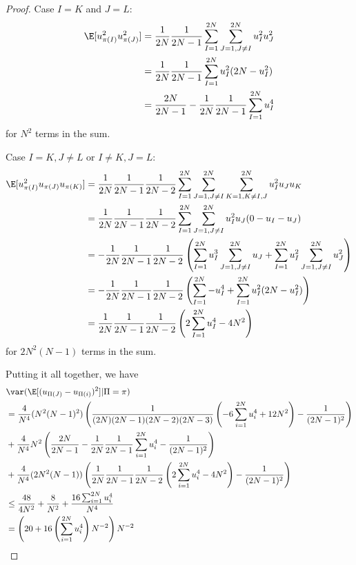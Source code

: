 \begin{proof}
  Case $I=K$ and $J=L$:
  \begin{align*}
    \E[u_{\pi(I)}^2 u_{\pi(J)}^2] &= \frac{1}{2N}\frac{1}{2N-1} \sum_{I=1}^{2N}
    \sum_{J=1, J\neq I}^{2N} u_{I}^2 u_{J}^2 \\
    &= \frac{1}{2N}\frac{1}{2N-1} \sum_{I=1}^{2N} u_{I}^2 (2N - u_{I}^2) \\
    &= \frac{2N}{2N-1}-\frac{1}{2N}\frac{1}{2N-1} \sum_{I=1}^{2N} u_{I}^4
  \end{align*}
  for $N^2$ terms in the sum.

  Case $I=K, J\neq L$ or $I\neq K, J= L$:
  \begin{align*}
    \E[u_{\pi(I)}^2 u_{\pi(J)} u_{\pi(K)}] &= \frac{1}{2N}\frac{1}{2N-1}\frac{1}{2N-2} \sum_{I=1}^{2N}
    \sum_{J=1, J\neq I}^{2N} \sum_{K=1, K \neq I,J}^{2N} u_{I}^2 u_{J} u_{K} \\
    &=\frac{1}{2N}\frac{1}{2N-1}\frac{1}{2N-2} \sum_{I=1}^{2N}
    \sum_{J=1, J\neq I}^{2N} u_{I}^2 u_{J} (0 - u_{I} - u_{J}) \\
    &=-\frac{1}{2N}\frac{1}{2N-1}\frac{1}{2N-2} \left(
      \sum_{I=1}^{2N} u_{I}^3 \sum_{J=1, J\neq I}^{2N} u_{J} +
      \sum_{I=1}^{2N} u_{I}^2 \sum_{J=1, J\neq I}^{2N} u_{J}^2
    \right ) \\
    &=-\frac{1}{2N}\frac{1}{2N-1}\frac{1}{2N-2} \left(
      \sum_{I=1}^{2N} - u_{I}^4 +
      \sum_{I=1}^{2N} u_{I}^2 (2N - u_{I}^2)
    \right ) \\
    &=\frac{1}{2N}\frac{1}{2N-1}\frac{1}{2N-2} \left(
      2 \sum_{I=1}^{2N} u_{I}^4 -4N^2 \right )
  \end{align*}
  for $2N^2(N-1)$ terms in the sum.

  Putting it all together, we have
  \begin{align*}
    &\var (\E[(u_{\Pi(J)}-u_{\Pi(i)})^2] | \Pi = \pi) \\
    &= \frac{4}{N^4} (N^2(N-1)^2)
    \left ( \frac{1}{(2N)(2N-1)(2N-2)(2N-3)}
      \left ( -6\sum_{i=1}^{2N}u_{i}^4 + 12N^2 \right ) - \frac{1}{(2N-1)^2} \right ) \\
    &+ \frac{4}{N^4} N^2 \left ( \frac{2N}{2N-1} -
      \frac{1}{2N}\frac{1}{2N-1}\sum_{i=1}^{2N}u_{i}^4 - \frac{1}{(2N-1)^2}
    \right ) \\
    &+ \frac{4}{N^4} (2N^2(N-1)) \left (
      \frac{1}{2N}\frac{1}{2N-1}\frac{1}{2N-2}\left (
        2 \sum_{i=1}^{2N} u_{i}^4 - 4N^2 \right ) - \frac{1}{(2N-1)^2}
    \right ) \\
    &\leq \frac{48}{4N^2} + \frac{8}{N^2} + \frac{16 \sum_{i=1}^{2N}
      u_{i}^4}{N^4} \\
    &= \left ( 20 + 16 \left ( \sum_{i=1}^{2N} u_{i}^4 \right )N^{-2} \right ) N^{-2}
  \end{align*}


\end{proof}
